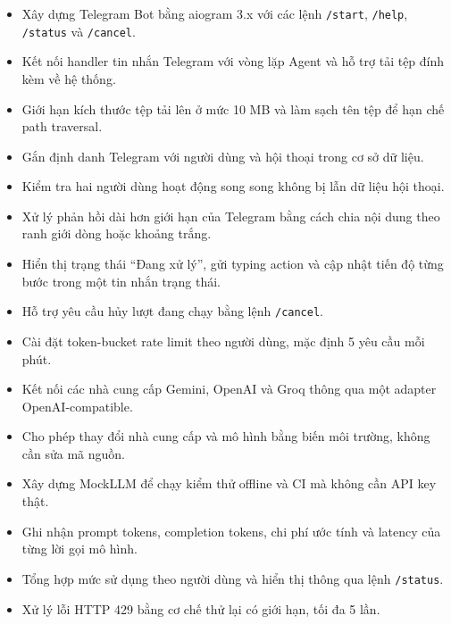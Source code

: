\documentclass[12pt,a4paper]{article}
\begin{document}
\begin{itemize}
    \item Xây dựng Telegram Bot bằng aiogram 3.x với các lệnh \texttt{/start}, \texttt{/help}, \texttt{/status} và \texttt{/cancel}.

    \item Kết nối handler tin nhắn Telegram với vòng lặp Agent và hỗ trợ tải tệp đính kèm về hệ thống.

    \item Giới hạn kích thước tệp tải lên ở mức 10 MB và làm sạch tên tệp để hạn chế path traversal.

    \item Gắn định danh Telegram với người dùng và hội thoại trong cơ sở dữ liệu.

    \item Kiểm tra hai người dùng hoạt động song song không bị lẫn dữ liệu hội thoại.

    \item Xử lý phản hồi dài hơn giới hạn của Telegram bằng cách chia nội dung theo ranh giới dòng hoặc khoảng trắng.

    \item Hiển thị trạng thái ``Đang xử lý'', gửi typing action và cập nhật tiến độ từng bước trong một tin nhắn trạng thái.

    \item Hỗ trợ yêu cầu hủy lượt đang chạy bằng lệnh \texttt{/cancel}.

    \item Cài đặt token-bucket rate limit theo người dùng, mặc định 5 yêu cầu mỗi phút.

    \item Kết nối các nhà cung cấp Gemini, OpenAI và Groq thông qua một adapter OpenAI-compatible.

    \item Cho phép thay đổi nhà cung cấp và mô hình bằng biến môi trường, không cần sửa mã nguồn.

    \item Xây dựng MockLLM để chạy kiểm thử offline và CI mà không cần API key thật.

    \item Ghi nhận prompt tokens, completion tokens, chi phí ước tính và latency của từng lời gọi mô hình.

    \item Tổng hợp mức sử dụng theo người dùng và hiển thị thông qua lệnh \texttt{/status}.

    \item Xử lý lỗi HTTP 429 bằng cơ chế thử lại có giới hạn, tối đa 5 lần.


\end{itemize}
\end{document}
